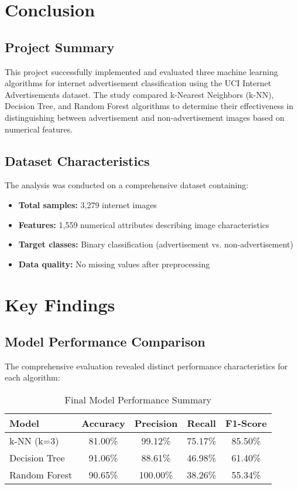 \section{Conclusion}
\label{sec:conclusion}

\subsection{Project Summary}

This project successfully implemented and evaluated three machine learning algorithms for internet advertisement classification using the UCI Internet Advertisements dataset. The study compared k-Nearest Neighbors (k-NN), Decision Tree, and Random Forest algorithms to determine their effectiveness in distinguishing between advertisement and non-advertisement images based on numerical features.

\subsection{Dataset Characteristics}

The analysis was conducted on a comprehensive dataset containing:
\begin{itemize}
    \item \textbf{Total samples:} 3,279 internet images
    \item \textbf{Features:} 1,559 numerical attributes describing image characteristics
    \item \textbf{Target classes:} Binary classification (advertisement vs. non-advertisement)
    \item \textbf{Data quality:} No missing values after preprocessing
\end{itemize}

\section{Key Findings}

\subsection{Model Performance Comparison}

The comprehensive evaluation revealed distinct performance characteristics for each algorithm:

\begin{table}[h]
\centering
\caption{Final Model Performance Summary}
\label{tab:final_performance}
\begin{tabular}{|l|c|c|c|c|}
\hline
\textbf{Model} & \textbf{Accuracy} & \textbf{Precision} & \textbf{Recall} & \textbf{F1-Score} \\
\hline
k-NN (k=3) & 81.00\% & 99.12\% & 75.17\% & 85.50\% \\
Decision Tree & 91.06\% & 88.61\% & 46.98\% & 61.40\% \\
Random Forest & 90.65\% & 100.00\% & 38.26\% & 55.34\% \\
\hline
\end{tabular}
\end{table}


